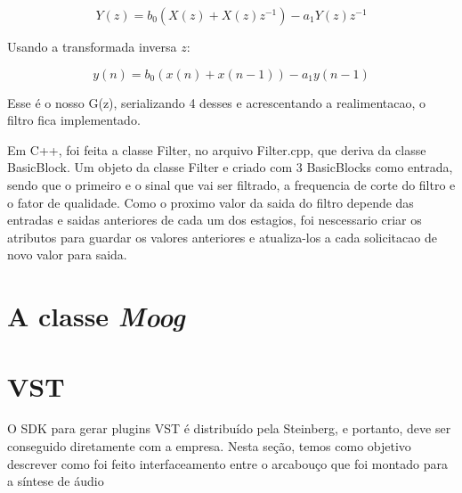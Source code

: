 \documentclass{article}
\begin{document}
\begin{equation}\label{eq:(5)}
Y(z) = b_0(X(z)+X(z)z^{-1})-a_1Y(z)z^{-1}
\end{equation}

Usando a transformada inversa $z$:

\begin{equation}\label{eq:(6)}
y(n)=b_0(x(n)+x(n-1))-a_1 y(n-1)  
\end{equation}


Esse é o nosso G(z), serializando 4 desses e acrescentando a realimentacao, o filtro fica implementado.

Em C++, foi feita a classe Filter, no arquivo Filter.cpp, que deriva da classe BasicBlock. Um objeto da classe Filter e criado com 3 BasicBlocks como entrada, sendo que o primeiro e o sinal que vai ser filtrado, a frequencia de corte do filtro e o fator de qualidade. Como o proximo valor da saida do filtro depende das entradas e saidas anteriores de cada um dos estagios, foi nescessario criar os atributos para guardar os valores anteriores e atualiza-los a cada solicitacao de novo valor para saida.

\section{A classe \emph{Moog}}

\section{VST}
O SDK para gerar plugins VST é distribuído pela Steinberg, e portanto, deve 
ser conseguido diretamente com a empresa. Nesta seção, temos como objetivo 
descrever como foi feito interfaceamento entre o arcabouço que foi montado 
para a síntese de áudio


\end{document}
